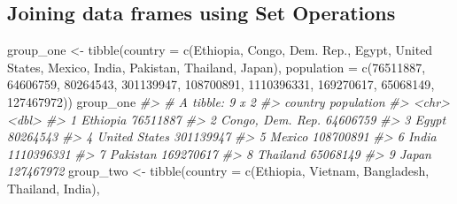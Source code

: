\documentclass[
]{book}
\newenvironment{Shaded}{\begin{snugshade}}{\end{snugshade}}
\newcommand{\AttributeTok}[1]{\textcolor[rgb]{0.77,0.63,0.00}{#1}}
\newcommand{\CommentTok}[1]{\textcolor[rgb]{0.56,0.35,0.01}{\textit{#1}}}
\newcommand{\DecValTok}[1]{\textcolor[rgb]{0.00,0.00,0.81}{#1}}
\newcommand{\FunctionTok}[1]{\textcolor[rgb]{0.00,0.00,0.00}{#1}}
\newcommand{\NormalTok}[1]{#1}
\newcommand{\OtherTok}[1]{\textcolor[rgb]{0.56,0.35,0.01}{#1}}
\newcommand{\StringTok}[1]{\textcolor[rgb]{0.31,0.60,0.02}{#1}}
\begin{document}
\hypertarget{joining-data-frames-using-set-operations}{%
\subsection{Joining data frames using Set Operations}\label{joining-data-frames-using-set-operations}}

\begin{Shaded}
\begin{Highlighting}[]
\NormalTok{group\_one }\OtherTok{\textless{}{-}} 
\FunctionTok{tibble}\NormalTok{(}\AttributeTok{country =} \FunctionTok{c}\NormalTok{(}\StringTok{\textquotesingle{}Ethiopia\textquotesingle{}}\NormalTok{, }\StringTok{\textquotesingle{}Congo, Dem. Rep.\textquotesingle{}}\NormalTok{, }\StringTok{\textquotesingle{}Egypt\textquotesingle{}}\NormalTok{, }\StringTok{\textquotesingle{}United States\textquotesingle{}}\NormalTok{, }
                   \StringTok{\textquotesingle{}Mexico\textquotesingle{}}\NormalTok{, }\StringTok{\textquotesingle{}India\textquotesingle{}}\NormalTok{, }\StringTok{\textquotesingle{}Pakistan\textquotesingle{}}\NormalTok{, }\StringTok{\textquotesingle{}Thailand\textquotesingle{}}\NormalTok{, }\StringTok{\textquotesingle{}Japan\textquotesingle{}}\NormalTok{),}
       \AttributeTok{population =} \FunctionTok{c}\NormalTok{(}\DecValTok{76511887}\NormalTok{, }\DecValTok{64606759}\NormalTok{, }\DecValTok{80264543}\NormalTok{, }\DecValTok{301139947}\NormalTok{, }\DecValTok{108700891}\NormalTok{, }
                      \DecValTok{1110396331}\NormalTok{, }\DecValTok{169270617}\NormalTok{, }\DecValTok{65068149}\NormalTok{, }\DecValTok{127467972}\NormalTok{))}
\NormalTok{group\_one}
\CommentTok{\#\textgreater{} \# A tibble: 9 x 2}
\CommentTok{\#\textgreater{}   country          population}
\CommentTok{\#\textgreater{}   \textless{}chr\textgreater{}                 \textless{}dbl\textgreater{}}
\CommentTok{\#\textgreater{} 1 Ethiopia           76511887}
\CommentTok{\#\textgreater{} 2 Congo, Dem. Rep.   64606759}
\CommentTok{\#\textgreater{} 3 Egypt              80264543}
\CommentTok{\#\textgreater{} 4 United States     301139947}
\CommentTok{\#\textgreater{} 5 Mexico            108700891}
\CommentTok{\#\textgreater{} 6 India            1110396331}
\CommentTok{\#\textgreater{} 7 Pakistan          169270617}
\CommentTok{\#\textgreater{} 8 Thailand           65068149}
\CommentTok{\#\textgreater{} 9 Japan             127467972}
\NormalTok{group\_two }\OtherTok{\textless{}{-}}
\FunctionTok{tibble}\NormalTok{(}\AttributeTok{country =} \FunctionTok{c}\NormalTok{(}\StringTok{\textquotesingle{}Ethiopia\textquotesingle{}}\NormalTok{, }\StringTok{\textquotesingle{}Vietnam\textquotesingle{}}\NormalTok{, }\StringTok{\textquotesingle{}Bangladesh\textquotesingle{}}\NormalTok{, }\StringTok{\textquotesingle{}Thailand\textquotesingle{}}\NormalTok{, }\StringTok{\textquotesingle{}India\textquotesingle{}}\NormalTok{),           }

\end{Highlighting}
\end{Shaded}
\end{document}
